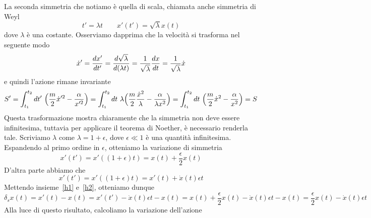 \begin{example}
        La seconda simmetria che notiamo è quella di scala, chiamata anche simmetria di Weyl
    \begin{equation*}
        t' = \lambda t \qquad x'(t') = \sqrt{\lambda} x(t)
    \end{equation*} 
        dove $\lambda$ è una costante. Osserviamo dapprima che la velocità si trasforma nel seguente modo
    \begin{equation*}
        \dot x' = \frac{dx'}{dt'} = \frac{d\sqrt{\lambda}}{d(\lambda t)} = \frac{1}{\sqrt{\lambda}} \frac{dx}{dt} = \frac{1}{\sqrt{\lambda}} \dot x
    \end{equation*} 
        e quindi l'azione rimane invariante
    \begin{equation*}
        S' = \int_{t_1}^{t_2}dt'~ \Big( \frac{m}{2} \dot x'^2 - \frac{\alpha}{x'^2} \Big) = \int_{t_1}^{t_2}dt~ \lambda \Big( \frac{m}{2} \frac{\dot x^2}{\lambda} - \frac{\alpha}{\lambda x^2} \Big) = \int_{t_1}^{t_2}dt~ \Big( \frac{m}{2} \dot x^2 - \frac{\alpha}{x^2} \Big) = S
    \end{equation*}
        Questa trasformazione mostra chiaramente che la simmetria non deve essere infinitesima, tuttavia per applicare il teorema di Noether, è necessario renderla tale. Scriviamo $\lambda$ come $\lambda = 1 + \epsilon$, dove $\epsilon \ll 1$ è una quantità infinitesima. Espandendo al primo ordine in $\epsilon$, otteniamo la variazione di simmetria
    \begin{equation} \label{h1}
        x'(t') = x'((1+\epsilon)t) = x(t) + \frac{\epsilon}{2} x(t)
    \end{equation}
        D'altra parte abbiamo che 
    \begin{equation} \label{h2}
        x'(t') = x'((1+\epsilon)t) = x'(t) + \dot x(t) \epsilon t
    \end{equation}
        Mettendo insieme~\eqref{h1} e~\eqref{h2}, otteniamo dunque
    \begin{equation*}
        \delta_s x(t) = x'(t) - x(t) = x'(t') - \dot x(t) \epsilon t - x(t) = x(t) + \frac{\epsilon}{2} x(t) - \dot x(t) \epsilon t - x(t) = \frac{\epsilon}{2} x(t) - \dot x(t) \epsilon t 
    \end{equation*}
        Alla luce di questo risultato, calcoliamo la variazione dell'azione
    \begin{equation*}
    \begin{aligned}

\end{aligned}
\end{equation*}
\end{example}
